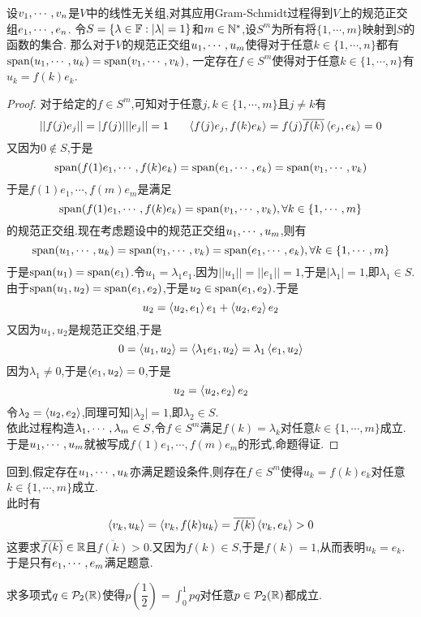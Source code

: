 \documentclass{ctexart}
\begin{document}
\begin{lemma}[Lemma.10]
    设${v}_1,\cdots,{v}_{n}$是$V$中的线性无关组,对其应用Gram-Schmidt过程得到$V$上的规范正交组${e}_1,\cdots,{e}_{n}$.%
    令$S=\{\lambda\in\mathbb{F}:|\lambda|=1\}$和$m\in\mathbb{N}^*$,设$S^m$为所有将$\{1,\cdots,m\}$映射到$S$的函数的集合.%
    那么对于$V$的规范正交组${u}_1,\cdots,{u}_{m}$使得对于任意$k\in\{1,\cdots,n\}$都有$\text{span}({u}_1,\cdots,{u}_{k})=\text{span}({v}_1,\cdots,{v}_{k})$,%
    一定存在$f\in S^{m}$使得对于任意$k\in\{1,\cdots,n\}$有$u_k=f(k)e_k$.
\end{lemma}
\begin{proof}
    对于给定的$f\in S^m$,可知对于任意$j,k\in\{1,\cdots,m\}$且$j\neq k$有
    \[||f(j)e_j||=|f(j)|||e_j||=1\ \ \ \ \ \inprod{f(j)e_j}{f(k)e_k}=f(j)\overline{f(k)}\inprod{e_j}{e_k}=0\]
    又因为$0\notin S$,于是
    \[\text{span}(f(1)e_1,\cdots,f(k)e_k)=\text{span}({e}_1,\cdots,{e}_{k})=\text{span}({v}_1,\cdots,{v}_{k})\]
    于是$f(1)e_1,\cdots,f(m)e_m$是满足
    \[\text{span}(f(1)e_1,\cdots,f(k)e_k)=\text{span}({v}_1,\cdots,{v}_{k}),\forall k\in\{1,\cdots,m\}\]
    的规范正交组.现在考虑题设中的规范正交组${u}_1,\cdots,{u}_{m}$,则有
    \[\text{span}({u}_1,\cdots,{u}_{k})=\text{span}({v}_1,\cdots,{v}_{k})=\text{span}({e}_1,\cdots,{e}_{k}),\forall k\in\{1,\cdots,m\}\]
    于是$\text{span}(u_1)=\text{span}(e_1)$.令$u_1=\lambda_1e_1$.因为$||u_1||=||e_1||=1$,于是$|\lambda_1|=1$,即$\lambda_1\in S$.\\
    由于$\text{span}(u_1,u_2)=\text{span}(e_1,e_2)$,于是$u_2\in\text{span}(e_1,e_2)$.于是
    \[u_2=\left\langle{u_2},{e_1}\right\rangle e_1+\left\langle{u_2},{e_2}\right\rangle e_2\]
    又因为$u_1,u_2$是规范正交组,于是
    \[0=\left\langle{u_1},{u_2}\right\rangle=\left\langle{\lambda_1e_1},{u_2}\right\rangle=\lambda_1\left\langle{e_1},{u_2}\right\rangle\]
    因为$\lambda_1\neq0$,于是$\left\langle{e_1},{u_2}\right\rangle=0$,于是
    \[u_2=\left\langle{u_2},{e_2}\right\rangle e_2\]
    令$\lambda_2=\left\langle{u_2},{e_2}\right\rangle$,同理可知$|\lambda_2|=1$,即$\lambda_2\in S$.\\
    依此过程构造${\lambda}_1,\cdots,{\lambda}_{m}\in S$,令$f\in S^m$满足$f(k)=\lambda_k$对任意$k\in\{1,\cdots,m\}$成立.\\
    于是${u}_1,\cdots,{u}_{m}$就被写成$f(1)e_1,\cdots,f(m)e_m$的形式,命题得证.
\end{proof}
\begin{solution}
    回到,假定存在${u}_1,\cdots,{u}_{k}$亦满足题设条件,则存在$f\in S^m$使得$u_k=f(k)e_k$对任意$k\in\{1,\cdots,m\}$成立.\\
    此时有
    \[\left\langle{v_k},{u_k}\right\rangle=\left\langle{v_k},{f(k)u_k}\right\rangle=\overline{f(k)}\left\langle{v_k},{e_k}\right\rangle>0\]
    这要求$\overline{f(k)}\in\mathbb{R}$且$\overline{f(k)}>0$.又因为$f(k)\in S$,于是$f(k)=1$,从而表明$u_k=e_k$.\\
    于是只有${e}_1,\cdots,{e}_{m}$满足题意.
\end{solution}
\begin{problem}[11.]
    求多项式$q\in\mathcal{P}_2(\mathbb{R})$使得$p\left(\dfrac12\right)=\displaystyle\int_0^1pq$对任意$p\in\mathcal{P}_2(\mathbb{R})$都成立.
\end{problem}
\end{document}
